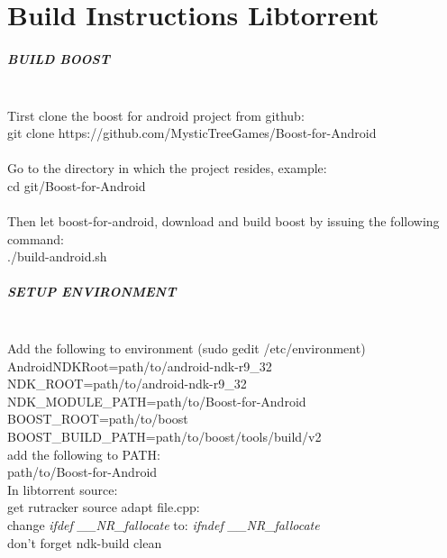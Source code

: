\chapter{Build Instructions Libtorrent}
\label{sec:build_libt}

\paragraph{BUILD BOOST}\mbox{}\\
Tirst clone the boost for android project from github:\\
git clone https://github.com/MysticTreeGames/Boost-for-Android\\
\\
Go to the directory in which the project resides, example:\\
cd git/Boost-for-Android\\
\\
Then let boost-for-android, download and build boost by issuing the following command:\\
./build-android.sh\\

\paragraph{SETUP ENVIRONMENT}\mbox{}\\
Add the following to environment (sudo gedit /etc/environment)\\
AndroidNDKRoot=path/to/android-ndk-r9\_32\\
NDK\_ROOT=path/to/android-ndk-r9\_32\\
NDK\_MODULE\_PATH=path/to/Boost-for-Android\\
BOOST\_ROOT=path/to/boost\\
BOOST\_BUILD\_PATH=path/to/boost/tools/build/v2\\

add the following to PATH:\\
path/to/Boost-for-Android\\

In libtorrent source:\\
get rutracker source
adapt file.cpp: \\
change \emph{ifdef \_\_NR\_fallocate} to: \emph{ifndef \_\_NR\_fallocate}\\

don't forget ndk-build clean\\